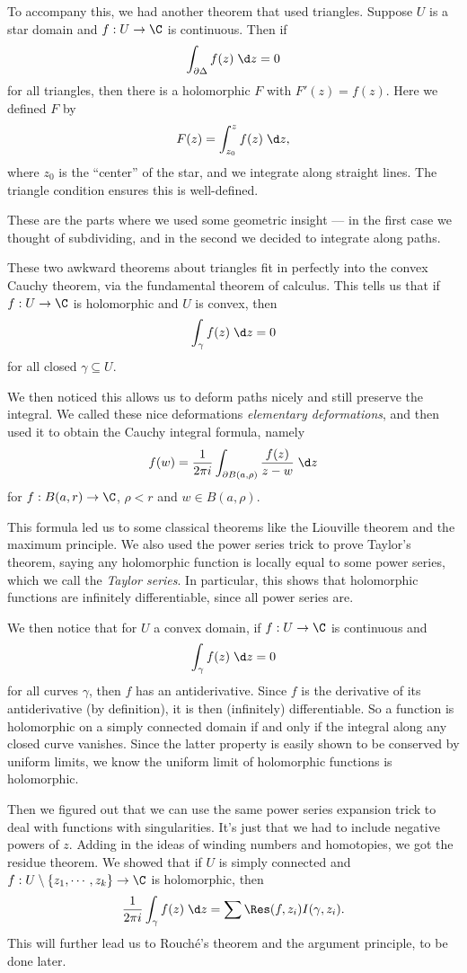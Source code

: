 \documentclass[a4paper]{article}
\begin{document}
To accompany this, we had another theorem that used triangles. Suppose $U$ is a star domain and $f: U \to \C$ is continuous. Then if
\[
  \int_{\partial \Delta} f(z)\;\d z = 0
\]
for all triangles, then there is a holomorphic $F$ with $F'(z) = f(z)$. Here we defined $F$ by
\[
  F(z) = \int_{z_0}^z f(z)\;\d z,
\]
where $z_0$ is the ``center'' of the star, and we integrate along straight lines. The triangle condition ensures this is well-defined.

These are the parts where we used some geometric insight --- in the first case we thought of subdividing, and in the second we decided to integrate along paths.

These two awkward theorems about triangles fit in perfectly into the convex Cauchy theorem, via the fundamental theorem of calculus. This tells us that if $f: U \to \C$ is holomorphic and $U$ is convex, then
\[
  \int_\gamma f(z)\;\d z = 0
\]
for all closed $\gamma \subseteq U$.

We then noticed this allows us to deform paths nicely and still preserve the integral. We called these nice deformations \emph{elementary deformations}, and then used it to obtain the Cauchy integral formula, namely
\[
  f(w) = \frac{1}{2\pi i} \int_{\partial B(a, \rho)} \frac{f(z)}{z - w}\;\d z
\]
for $f: B(a, r) \to \C$, $\rho < r$ and $w \in B(a, \rho)$.

This formula led us to some classical theorems like the Liouville theorem and the maximum principle. We also used the power series trick to prove Taylor's theorem, saying any holomorphic function is locally equal to some power series, which we call the \emph{Taylor series}. In particular, this shows that holomorphic functions are infinitely differentiable, since all power series are.

We then notice that for $U$ a convex domain, if $f: U \to \C$ is continuous and
\[
  \int_\gamma f(z)\;\d z = 0
\]
for all curves $\gamma$, then $f$ has an antiderivative. Since $f$ is the derivative of its antiderivative (by definition), it is then (infinitely) differentiable. So a function is holomorphic on a simply connected domain if and only if the integral along any closed curve vanishes. Since the latter property is easily shown to be conserved by uniform limits, we know the uniform limit of holomorphic functions is holomorphic.

Then we figured out that we can use the same power series expansion trick to deal with functions with singularities. It's just that we had to include negative powers of $z$. Adding in the ideas of winding numbers and homotopies, we got the residue theorem. We showed that if $U$ is simply connected and $f: U \setminus \{z_1, \cdots, z_k\} \to \C$ is holomorphic, then
\[
  \frac{1}{2\pi i} \int_{\gamma} f(z)\;\d z = \sum \Res(f, z_i) I(\gamma, z_i).
\]
This will further lead us to Rouch\'e's theorem and the argument principle, to be done later.
\end{document}
